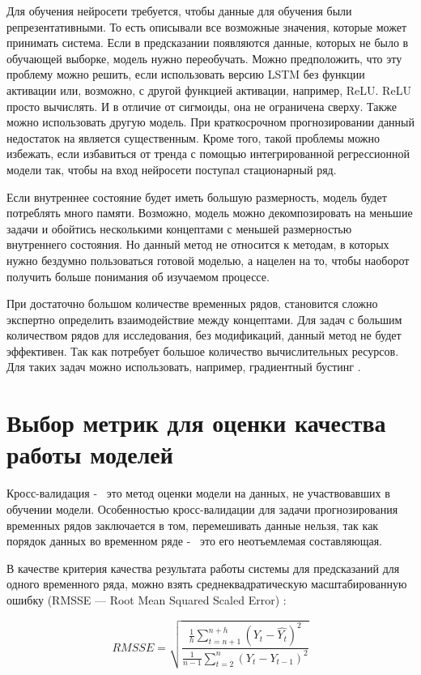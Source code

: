 Для обучения  нейросети требуется, чтобы
данные для обучения были репрезентативными. То есть
описывали все возможные значения, которые может принимать система.
Если в предсказании появляются данные, которых не было в обучающей выборке,
модель нужно переобучать. Можно предположить, что эту проблему можно решить,
если использовать версию LSTM без функции активации или, возможно, с другой
функцией активации, например, ReLU. ReLU просто вычислять. И в отличие от
сигмоиды, она не ограничена сверху. Также можно использовать другую модель.
При краткосрочном прогнозировании данный недостаток на является существенным.
Кроме того, такой проблемы можно избежать, если избавиться от тренда с
помощью интегрированной регрессионной модели так, чтобы на вход нейросети
поступал стационарный ряд.

Если внутреннее состояние будет иметь большую размерность,
модель будет потреблять много памяти. Возможно, модель можно
декомпозировать на меньшие задачи и обойтись несколькими концептами
с меньшей размерностью внутреннего состояния.
Но данный метод не относится к методам, в которых нужно бездумно
пользоваться готовой моделью, а нацелен на то, чтобы наоборот
получить больше понимания об изучаемом процессе.

При достаточно большом количестве временных рядов,
становится сложно экспертно определить взаимодействие между концептами.
Для задач с большим количеством рядов для исследования, без
модификаций, данный метод не будет эффективен. Так как потребует
большое количество вычислительных ресурсов.
Для таких задач можно использовать, например, градиентный бустинг \cite{friedman2002stochastic}.

\section{Выбор метрик для оценки качества работы моделей}

Кросс-валидация -~ это метод оценки модели на данных, не участвовавших
в обучении модели. Особенностью кросс-валидации для задачи прогнозирования
временных рядов заключается в том, перемешивать данные нельзя,
так как порядок данных во временном ряде -~ это его неотъемлемая составляющая.

В качестве критерия качества результата работы системы для предсказаний
для одного временного ряда, можно взять среднеквадратическую
масштабированную ошибку (RMSSE --- Root Mean Squared Scaled Error) \cite{hyndman2006another, shcherbakov2013survey}:

\begin{equation}\label{eq:rmsse}
	RMSSE = \sqrt{ \frac{ \frac{1}{h} \sum_{t=n+1}^{n+h}(Y_t - \hat{Y_t})^2  }{ \frac{1}{n-1} \sum_{t=2}^{n} (Y_t - Y_{t-1})^2 } }
\end{equation}


